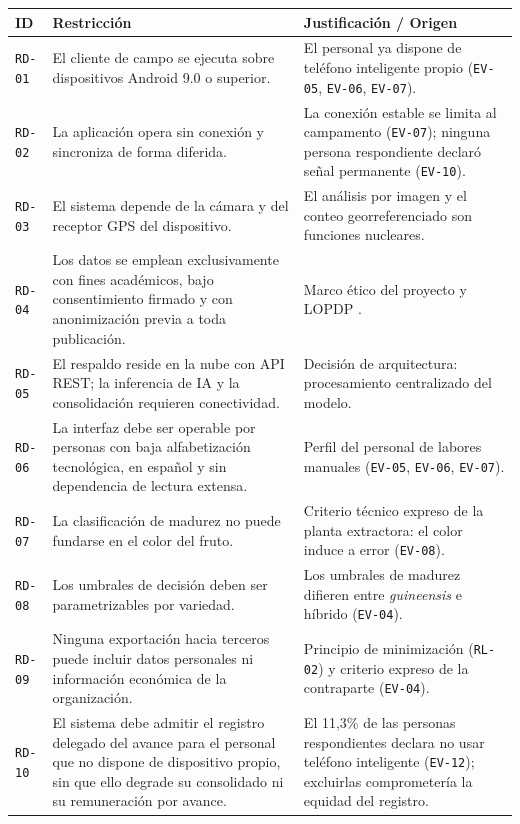 \documentclass[11pt,a4paper]{article}
\newcommand{\id}[1]{\texttt{\begingroup\hyphenpenalty=10000\relax#1\endgroup}}
\renewcommand{\id}[1]{\texttt{#1}}
\begin{document}
\begin{longtable}{|C{1.5cm}|L{6.8cm}|L{6.6cm}|}
\hline
{}\textbf{ID} & \textbf{Restricción} & \textbf{Justificación / Origen} \\
\hline
\endhead
\id{RD-01} & El cliente de campo se ejecuta sobre dispositivos Android 9.0 o superior. & El personal ya dispone de teléfono inteligente propio (\id{EV-05}, \id{EV-06}, \id{EV-07}). \\ \hline
\id{RD-02} & La aplicación opera sin conexión y sincroniza de forma diferida. & La conexión estable se limita al campamento (\id{EV-07}); ninguna persona respondiente declaró señal permanente (\id{EV-10}). \\ \hline
\id{RD-03} & El sistema depende de la cámara y del receptor GPS del dispositivo. & El análisis por imagen y el conteo georreferenciado son funciones nucleares. \\ \hline
\id{RD-04} & Los datos se emplean exclusivamente con fines académicos, bajo consentimiento firmado y con anonimización previa a toda publicación. & Marco ético del proyecto y LOPDP \cite{lopdp}. \\ \hline
\id{RD-05} & El respaldo reside en la nube con API REST; la inferencia de IA y la consolidación requieren conectividad. & Decisión de arquitectura: procesamiento centralizado del modelo. \\ \hline
\id{RD-06} & La interfaz debe ser operable por personas con baja alfabetización tecnológica, en español y sin dependencia de lectura extensa. & Perfil del personal de labores manuales (\id{EV-05}, \id{EV-06}, \id{EV-07}). \\ \hline
\id{RD-07} & La clasificación de madurez no puede fundarse en el color del fruto. & Criterio técnico expreso de la planta extractora: el color induce a error (\id{EV-08}). \\ \hline
\id{RD-08} & Los umbrales de decisión deben ser parametrizables por variedad. & Los umbrales de madurez difieren entre \emph{guineensis} e híbrido (\id{EV-04}). \\ \hline
\id{RD-09} & Ninguna exportación hacia terceros puede incluir datos personales ni información económica de la organización. & Principio de minimización (\id{RL-02}) y criterio expreso de la contraparte (\id{EV-04}). \\ \hline
\id{RD-10} & El sistema debe admitir el registro delegado del avance para el personal que no dispone de dispositivo propio, sin que ello degrade su consolidado ni su remuneración por avance. & El 11{,}3\% de las personas respondientes declara no usar teléfono inteligente (\id{EV-12}); excluirlas comprometería la equidad del registro. \\ \hline

\end{longtable}
\end{document}
